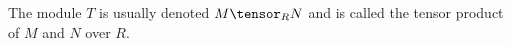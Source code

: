 The module $T$ is usually denoted $M\tensor_{R} N$ and is called the tensor
product of $M$ and $N$ over $R$.
